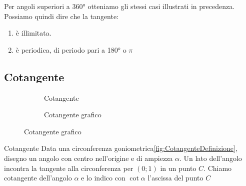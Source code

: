 Per angoli superiori a \ang{360} otteniamo gli stessi casi illustrati in precedenza. 
Possiamo quindi dire che la tangente:
\begin{enumerate}
	\item è illimitata.
	\item è periodica, di periodo pari a \ang{180} o $\pi$
\end{enumerate} 
\begin{figure}
	\centering

	\label{fig:AndamentoTangente1}
\end{figure}%
\begin{figure}
	\centering
	
\label{fig:AndamentoTangente2}
\end{figure}%
\subsection{Cotangente}
\label{sec:Cotangente}
\begin{figure}
	\begin{subfigure}[b]{.5\linewidth}
		\centering
		
	\caption{Cotangente}\label{fig:CotangenteDefinizione}
	\end{subfigure}%
	\begin{subfigure}[b]{.5\linewidth}
		\centering
		\caption{Cotangente grafico}\label{fig:CotangenteGrafico}
	\end{subfigure}
	\label{tab:funzcotg}
\end{figure}
%		
\begin{definizionet}{Cotangente}{}
	Data una circonferenza goniometrica\nobs\vref{fig:CotangenteDefinizione}, disegno un angolo con centro nell'origine e di ampiezza $\alpha$. Un lato dell'angolo incontra la tangente  alla circonferenza  per $(0;1)$ in un punto $C$.  Chiamo cotangente dell'angolo $\alpha$ e lo indico con $\cot\alpha$ l'ascissa  del punto $C$
\end{definizionet}

